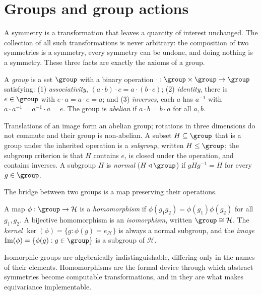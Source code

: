 \section{Groups and group actions}
\label{sec:found:groups}

A symmetry is a transformation that leaves a quantity of interest unchanged. The
collection of all such transformations is never arbitrary: the composition of two
symmetries is a symmetry, every symmetry can be undone, and doing nothing is a
symmetry. These three facts are exactly the axioms of a group.

\begin{definition}[Group]
\label{def:found:group}
A \emph{group} is a set $\group$ with a binary operation
$\cdot : \group \times \group \to \group$ satisfying: (1) \emph{associativity},
$(a \cdot b) \cdot c = a \cdot (b \cdot c)$; (2) \emph{identity}, there is
$e \in \group$ with $e \cdot a = a \cdot e = a$; and (3) \emph{inverses}, each
$a$ has $a^{-1}$ with $a \cdot a^{-1} = a^{-1} \cdot a = e$. The group is
\emph{abelian} if $a \cdot b = b \cdot a$ for all $a, b$.
\end{definition}

Translations of an image form an abelian group; rotations in three dimensions do
not commute and their group is non-abelian. A subset $H \subseteq \group$ that is
a group under the inherited operation is a \emph{subgroup}, written
$H \le \group$; the subgroup criterion is that $H$ contains $e$, is closed under
the operation, and contains inverses. A subgroup $H$ is \emph{normal}
($H \triangleleft \group$) if $gHg^{-1} = H$ for every $g \in \group$.

The bridge between two groups is a map preserving their operations.

\begin{definition}[Homomorphism]
\label{def:found:homomorphism}
A map $\phi : \group \to \mathcal{H}$ is a \emph{homomorphism} if
$\phi(g_1 g_2) = \phi(g_1)\phi(g_2)$ for all $g_1, g_2$. A bijective
homomorphism is an \emph{isomorphism}, written $\group \cong \mathcal{H}$. The
\emph{kernel} $\ker(\phi) = \{g : \phi(g) = e_{\mathcal{H}}\}$ is always a normal
subgroup, and the \emph{image} $\Img(\phi) = \{\phi(g) : g \in \group\}$ is a
subgroup of $\mathcal{H}$.
\end{definition}

Isomorphic groups are algebraically indistinguishable, differing only in the
names of their elements. Homomorphisms are the formal device through which
abstract symmetries become computable transformations, and in
 they are what makes equivariance implementable.


